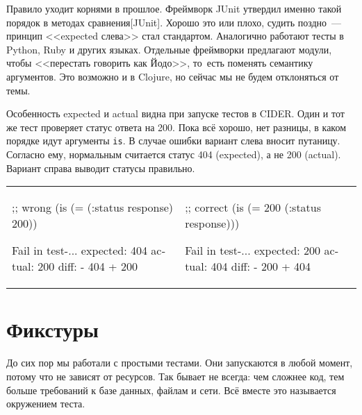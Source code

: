 
Правило уходит корнями в прошлое. Фреймворк JUnit утвердил именно такой порядок
в методах сравнения[JUnit].
Хорошо это или плохо, судить поздно~--- принцип <<expected слева>> стал
стандартом. Аналогично работают тесты в Python, Ruby и других языках. Отдельные
фреймворки предлагают модули, чтобы <<перестать говорить как Йодо>>, то~есть
поменять семантику аргументов. Это возможно и в Clojure, но сейчас мы не будем
отклоняться от темы.


Особенность expected и actual видна при запуске тестов в CIDER. Один и тот же
тест проверяет статус ответа на 200. Пока всё хорошо, нет разницы, в каком
порядке идут аргументы \verb|is|. В случае ошибки вариант слева вносит
путаницу. Согласно ему, нормальным считается статус 404 (expected), а не 200
(actual). Вариант справа выводит статусы правильно.

\noindent
\begin{tabular}{ @{}p{5cm} @{}p{5cm} }

\begin{english}
  \begin{clojure}
;; wrong
(is (= (:status response)
       200))

Fail in test-...
expected: 404
  actual: 200
    diff: - 404
          + 200
  \end{clojure}
\end{english}

&

\begin{english}
  \begin{clojure}
;; correct
(is (= 200
       (:status response)))

Fail in test-...
expected: 200
  actual: 404
    diff: - 200
          + 404
  \end{clojure}
\end{english}

\end{tabular}

\section{Фикстуры}


До сих пор мы работали с простыми тестами. Они запускаются в любой момент,
потому что не зависят от ресурсов. Так бывает не всегда: чем сложнее код, тем
больше требований к базе данных, файлам и сети. Всё вместе это называется
окружением теста.

